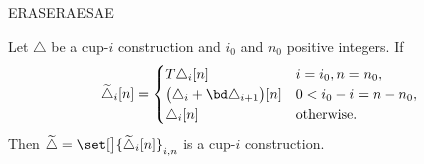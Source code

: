 \newpage
ERASERAESAE
\begin{proposition}
	Let $\triangle$ be a cup-$i$ construction and $i_0$ and $n_0$ positive integers.
	If
	\[
	\widetilde\triangle_i[n] =
	\begin{cases}
		T\triangle_{i}[n] & i = i_0,n=n_0, \\
		\big(\triangle_{i} + \bd \triangle_{i+1}\big)[n] & 0 < i_0-i =n-n_0, \\
		\triangle_{i}[n] & \text{otherwise}.
	\end{cases}
	\]
	Then $\widetilde\triangle = \set[\big]{\widetilde\triangle_i[n]}_{i,n}$ is a cup-$i$ construction.
\end{proposition}

